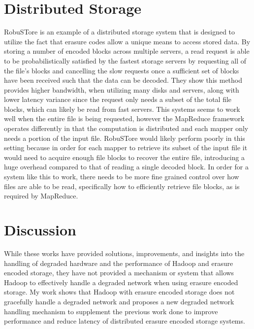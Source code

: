 \documentclass{ucetd}
\begin{document}
\section{Distributed Storage}

RobuSTore \cite{Xia} is an example of a distributed storage system that is
designed to utilize the fact that erasure codes allow a unique means to access
stored data. By storing a number of encoded blocks across multiple servers, a
read request is able to be probabilistically satisfied by the fastest storage
servers by requesting all of the file's blocks and cancelling the slow requests
once a sufficient set of blocks have been received such that the data can be
decoded.  They show this method provides higher bandwidth, when utilizing many
disks and servers, along with lower latency variance since the request only
needs a subset of the total file blocks, which can likely be read from fast
servers. This systems seems to work well when the entire file is being
requested, however the MapReduce framework operates differently in that the
computation is distributed and each mapper only needs a portion of the input
file.  RobuSTore would likely perform poorly in this setting because in order
for each mapper to retrieve its subset of the input file it would need to
acquire enough file blocks to recover the entire file, introducing a huge
overhead compared to that of reading a single decoded block.  In order for a
system like this to work, there needs to be more fine grained control over how
files are able to be read, specifically how to efficiently retrieve file blocks,
as is required by MapReduce.

\section{Discussion}

While these works have provided solutions, improvements, and insights into the
handling of degraded hardware and the performance of Hadoop and erasure encoded
storage, they have not provided a mechanism or system that allows Hadoop to
effectively handle a degraded network when using erasure encoded storage. My
work shows that Hadoop with erasure encoded storage does not gracefully handle
a degraded network and proposes a new degraded network handling mechanism to
supplement the previous work done to improve performance and reduce latency of
distributed erasure encoded storage systems.

\end{document}

